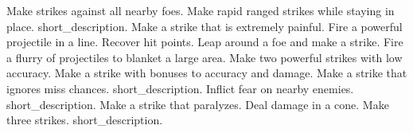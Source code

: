 \begin{spelllist}
 Make strikes against all nearby foes.
 Make rapid ranged strikes while staying in place.
 short_description.
 Make a strike that is extremely painful.
 Fire a powerful projectile in a line.
 Recover hit points.
 Leap around a foe and make a strike.
 Fire a flurry of projectiles to blanket a large area.
 Make two powerful strikes with low accuracy.
 Make a strike with bonuses to accuracy and damage.
 Make a strike that ignores miss chances.
 short_description.
 Inflict fear on nearby enemies.
 short_description.
 Make a strike that paralyzes.
 Deal damage in a cone.
 Make three strikes.
 short_description.
\end{spelllist}
